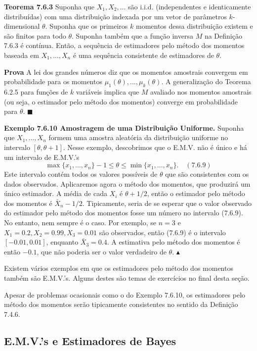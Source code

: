\textbf{Teorema 7.6.3} Suponha que $X_1, X_2, \dots$ são i.i.d. (independentes e identicamente distribuídas) com uma distribuição indexada por um vetor de parâmetros $k$-dimensional $\theta$. Suponha que os primeiros $k$ momentos dessa distribuição existem e são finitos para todo $\theta$. Suponha também que a função inversa $M$ na Definição 7.6.3 é contínua. Então, a sequência de estimadores pelo método dos momentos baseada em $X_1, \dots, X_n$ é uma sequência consistente de estimadores de $\theta$.

\textbf{Prova} A lei dos grandes números diz que os momentos amostrais convergem em probabilidade para os momentos $\mu_1(\theta), \dots, \mu_k(\theta)$. A generalização do Teorema 6.2.5 para funções de $k$ variáveis implica que $M$ avaliado nos momentos amostrais (ou seja, o estimador pelo método dos momentos) converge em probabilidade para $\theta$. $\blacksquare$

\textbf{Exemplo 7.6.10 Amostragem de uma Distribuição Uniforme.} Suponha que $X_1, \dots, X_n$ formem uma amostra aleatória da distribuição uniforme no intervalo $[\theta, \theta+1]$. Nesse exemplo, descobrimos que o E.M.V. não é único e há um intervalo de E.M.V.'s
$$ \max\{x_1, \dots, x_n\} - 1 \le \theta \le \min\{x_1, \dots, x_n\}. \quad (7.6.9) $$
Este intervalo contém todos os valores possíveis de $\theta$ que são consistentes com os dados observados. Aplicaremos agora o método dos momentos, que produzirá um único estimador. A média de cada $X_i$ é $\theta + 1/2$, então o estimador pelo método dos momentos é $\bar{X}_n - 1/2$. Tipicamente, seria de se esperar que o valor observado do estimador pelo método dos momentos fosse um número no intervalo (7.6.9). No entanto, nem sempre é o caso. Por exemplo, se $n=3$ e $X_1=0.2, X_2=0.99, X_3=0.01$ são observados, então (7.6.9) é o intervalo $[-0.01, 0.01]$, enquanto $\bar{X}_3 = 0.4$. A estimativa pelo método dos momentos é então $-0.1$, que não poderia ser o valor verdadeiro de $\theta$. $\blacktriangle$

Existem vários exemplos em que os estimadores pelo método dos momentos também são E.M.V.'s. Alguns destes são temas de exercícios no final desta seção.

Apesar de problemas ocasionais como o do Exemplo 7.6.10, os estimadores pelo método dos momentos serão tipicamente consistentes no sentido da Definição 7.4.6.

\subsection*{E.M.V.'s e Estimadores de Bayes}

